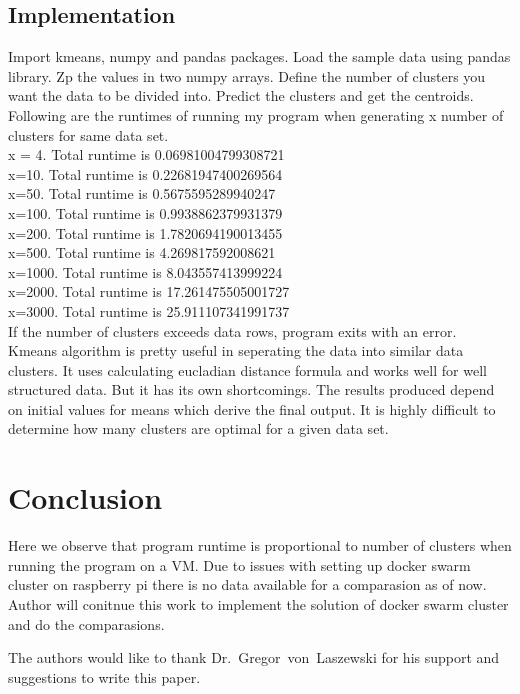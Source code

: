 \subsection{Implementation}
Import kmeans, numpy and pandas packages. Load the sample data using
pandas library. Zp the values in two numpy arrays. Define the number
of clusters you want the data to be divided into. Predict the clusters
and get the centroids. Following are the runtimes of running my
program when generating x number of clusters for same data set.\\
x = 4. Total runtime is  0.06981004799308721\\
x=10. Total runtime is  0.22681947400269564\\
x=50. Total runtime is  0.5675595289940247\\
x=100. Total runtime is  0.9938862379931379\\
x=200. Total runtime is  1.7820694190013455\\
x=500. Total runtime is  4.269817592008621\\
x=1000. Total runtime is  8.043557413999224\\
x=2000. Total runtime is  17.261475505001727\\
x=3000. Total runtime is  25.911107341991737\\
If the number of clusters exceeds data rows, program exits with an
error. \\
Kmeans algorithm is pretty useful in seperating the data into similar
data clusters. It uses calculating eucladian distance formula and works well for well
structured data. But it has its own shortcomings. The results produced
depend on initial values for means which derive the final
output. It is highly difficult to determine how many clusters are
optimal for a given data set.

\section{Conclusion}
Here we observe that program runtime is proportional to number of
clusters when running the program on a VM. Due to issues with setting
up docker swarm cluster on raspberry pi there is no data available for
a comparasion as of now. Author will conitnue this work to implement
the solution of docker swarm cluster and do the comparasions. 


\begin{acks}

  The authors would like to thank Dr.~Gregor~von~Laszewski for his
  support and suggestions to write this paper.

\end{acks}


 

